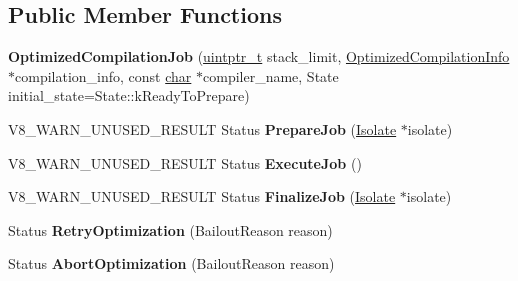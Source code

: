 \subsection*{Public Member Functions}
\begin{DoxyCompactItemize}
\item 
\mbox{\label{classv8_1_1internal_1_1OptimizedCompilationJob_a13b4ba385f9d95b89d1261a3e470bfe4}} 
{\bfseries Optimized\+Compilation\+Job} (\mbox{\hyperlink{classuintptr__t}{uintptr\+\_\+t}} stack\+\_\+limit, \mbox{\hyperlink{classv8_1_1internal_1_1OptimizedCompilationInfo}{Optimized\+Compilation\+Info}} $\ast$compilation\+\_\+info, const \mbox{\hyperlink{classchar}{char}} $\ast$compiler\+\_\+name, State initial\+\_\+state=State\+::k\+Ready\+To\+Prepare)
\item 
\mbox{\label{classv8_1_1internal_1_1OptimizedCompilationJob_ac48cf85f467ed991a11f6f37d63ad38a}} 
V8\+\_\+\+W\+A\+R\+N\+\_\+\+U\+N\+U\+S\+E\+D\+\_\+\+R\+E\+S\+U\+LT Status {\bfseries Prepare\+Job} (\mbox{\hyperlink{classv8_1_1internal_1_1Isolate}{Isolate}} $\ast$isolate)
\item 
\mbox{\label{classv8_1_1internal_1_1OptimizedCompilationJob_aa96eed4532cb8870a7dd49523431f31e}} 
V8\+\_\+\+W\+A\+R\+N\+\_\+\+U\+N\+U\+S\+E\+D\+\_\+\+R\+E\+S\+U\+LT Status {\bfseries Execute\+Job} ()
\item 
\mbox{\label{classv8_1_1internal_1_1OptimizedCompilationJob_a650ee9b79c9d93625d244ee3f7006b89}} 
V8\+\_\+\+W\+A\+R\+N\+\_\+\+U\+N\+U\+S\+E\+D\+\_\+\+R\+E\+S\+U\+LT Status {\bfseries Finalize\+Job} (\mbox{\hyperlink{classv8_1_1internal_1_1Isolate}{Isolate}} $\ast$isolate)
\item 
\mbox{\label{classv8_1_1internal_1_1OptimizedCompilationJob_a02440abe61d7c50867c502cf037f7b7b}} 
Status {\bfseries Retry\+Optimization} (Bailout\+Reason reason)
\item 
\mbox{\label{classv8_1_1internal_1_1OptimizedCompilationJob_aa04412667be82d5c87cc2c6488bda3db}} 
Status {\bfseries Abort\+Optimization} (Bailout\+Reason reason)

\end{DoxyCompactItemize}
